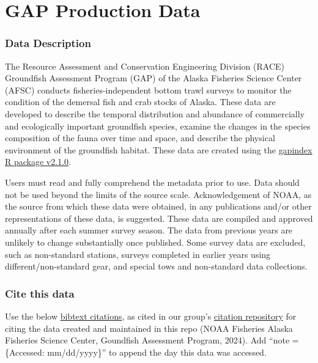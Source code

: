 \documentclass[
  letterpaper,
  oneside,
  open=any]{scrbook}
\begin{document}
\part{GAP Production Data}

\hypertarget{data-description}{%
\section*{Data Description}\label{data-description}}


The Resource Assessment and Conservation Engineering Division (RACE)
Groundfish Assessment Program (GAP) of the Alaska Fisheries Science
Center (AFSC) conducts fisheries-independent bottom trawl surveys to
monitor the condition of the demersal fish and crab stocks of Alaska.
These data are developed to describe the temporal distribution and
abundance of commercially and ecologically important groundfish species,
examine the changes in the species composition of the fauna over time
and space, and describe the physical environment of the groundfish
habitat. These data are created using the
\href{https://afsc-gap-products.github.io/gapindex/index.html}{gapindex
R package v2.1.0}.

Users must read and fully comprehend the metadata prior to use. Data
should not be used beyond the limits of the source scale.
Acknowledgement of NOAA, as the source from which these data were
obtained, in any publications and/or other representations of these
data, is suggested. These data are compiled and approved annually after
each summer survey season. The data from previous years are unlikely to
change substantially once published. Some survey data are excluded, such
as non-standard stations, surveys completed in earlier years using
different/non-standard gear, and special tows and non-standard data
collections.

\hypertarget{cite-this-data-1}{%
\section*{Cite this data}\label{cite-this-data-1}}


Use the below
\href{https://github.com/afsc-gap-products/gap_products/blob/main/code/CITATION_GAPProducts.bib}{bibtext
citations}, as cited in our group's
\href{https://github.com/afsc-gap-products/citations/blob/main/cite/bibliography.bib}{citation
repository} for citing the data created and maintained in this repo
(NOAA Fisheries Alaska Fisheries Science Center, Goundfish Assessment
Program, 2024). Add ``note = \{Accessed: mm/dd/yyyy\}'' to append the
day this data was accessed.
\end{document}
